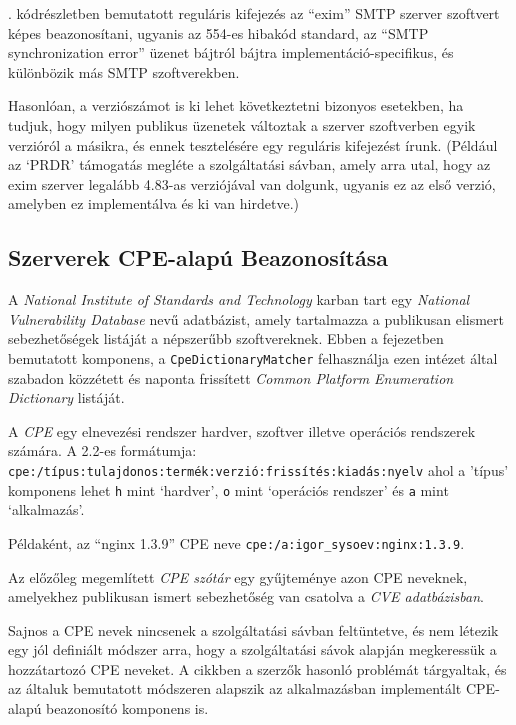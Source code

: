 \documentclass[a4paper,12pt]{article}
\begin{document}
	\Az{\ref{eximregex}}. kódrészletben bemutatott reguláris kifejezés az ``exim'' SMTP szerver szoftvert képes beazonosítani, ugyanis az 554-es hibakód standard, az ``SMTP synchronization error'' üzenet bájtról bájtra implementáció-specifikus, és különbözik más SMTP szoftverekben.
	
	Hasonlóan, a verziószámot is ki lehet következtetni bizonyos esetekben, ha tudjuk, hogy milyen publikus üzenetek változtak a szerver szoftverben egyik verzióról a másikra, és ennek tesztelésére egy reguláris kifejezést írunk. (Például az `PRDR' támogatás megléte a szolgáltatási sávban, amely arra utal, hogy az exim szerver legalább 4.83-as verziójával van dolgunk, ugyanis ez az első verzió, amelyben ez implementálva és ki van hirdetve.)

\subsection{Szerverek CPE-alapú Beazonosítása} \label{ssec:matchcpe}

	A \textit{National Institute of Standards and Technology} karban tart egy \textit{National Vulnerability Database} nevű adatbázist, amely tartalmazza a publikusan elismert sebezhetőségek listáját a népszerűbb szoftvereknek. Ebben a fejezetben bemutatott komponens, a \texttt{CpeDictionaryMatcher} felhasználja ezen intézet által szabadon közzétett és naponta frissített \textit{Common Platform Enumeration Dictionary} listáját.
	
	A \textit{CPE} egy elnevezési rendszer hardver, szoftver illetve operációs rendszerek számára\cite{cpe22}. A 2.2-es formátumja: \texttt{cpe:/típus:tulajdonos:termék:verzió:frissítés:kiadás:nyelv} ahol a 'típus' komponens lehet \texttt{h} mint `hardver', \texttt{o} mint `operációs rendszer' és \texttt{a} mint `alkalmazás'.
	
	Példaként, az ``nginx 1.3.9'' CPE neve \texttt{cpe:/a:igor_sysoev:nginx:1.3.9}.
	
	Az előzőleg megemlített \textit{CPE szótár} egy gyűjteménye azon CPE neveknek, amelyekhez publikusan ismert sebezhetőség van csatolva a \textit{CVE adatbázisban}.
	
	Sajnos a CPE nevek nincsenek a szolgáltatási sávban feltüntetve, és nem létezik egy jól definiált módszer arra, hogy a szolgáltatási sávok alapján megkeressük a hozzátartozó CPE neveket. A \cite{shovat15} cikkben a szerzők hasonló problémát tárgyaltak, és az általuk bemutatott módszeren alapszik az alkalmazásban implementált CPE-alapú beazonosító komponens is.
	
\end{document}
